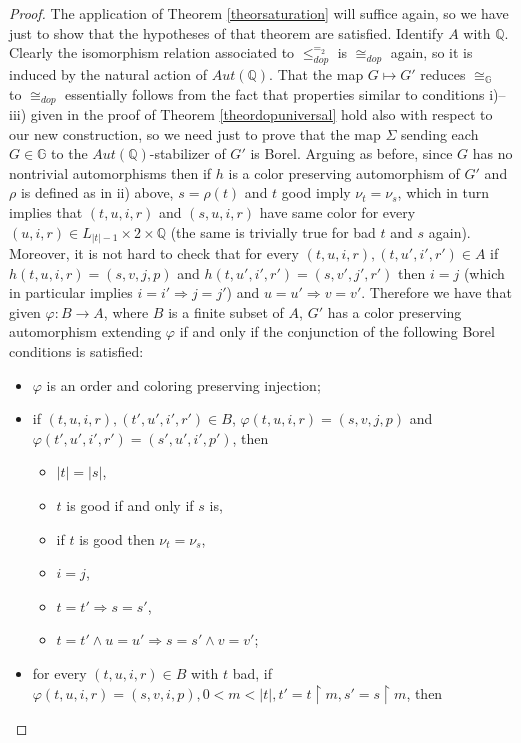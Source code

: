 \documentclass{amsart}
\theoremstyle{definition}
\theoremstyle{remark}
\begin{document}
\begin{proof}
 The application of Theorem \ref{theorsaturation} will suffice again,
 so we have just to show that the hypotheses of that
 theorem are satisfied. Identify $A$ with $ {\mathbb{Q}} $. Clearly the
 isomorphism relation associated to $\leq_{dop}^{=_2}$ is
  $\cong_{dop}$ again, so it is induced by the natural action of
  $Aut({\mathbb{Q}})$. That the map $G \mapsto G'$ reduces $\cong_{\mathbb{G}}$ to $\cong_{dop}$ essentially follows from
 the fact that properties similar to conditions
 i)--iii) given in the proof of Theorem \ref{theordopuniversal} hold
 also with respect to our new construction, so we
 need just to prove that the map $\Sigma$ sending each $G \in {\mathbb{G}}$ to the
 $Aut({\mathbb{Q}})$-stabilizer of $G'$ is Borel. Arguing as before,
 since $G$ has no nontrivial automorphisms then if $h$ is a color preserving
 automorphism of $G'$ and $\rho$ is defined as in ii)
 above, $s= \rho(t)$ and $t$ good imply $\nu_t = \nu_s$, which in
 turn implies that $(t,u,i,r)$ and $(s,u,i,r)$ have
 same color for every $(u,i,r) \in L_{|t|-1} \times 2 \times {\mathbb{Q}}$
 (the same is trivially true for bad $t$ and $s$
 again). Moreover, it is not hard to check that for every $(t,u,i,r),
 (t,u',i',r') \in A$ if $h(t,u,i,r) = (s,v,j,p)$ and
 $h(t,u',i',r') = (s,v',j',r')$ then $i=j$ (which in particular
 implies $i= i' {\Rightarrow} j = j'$) and $u = u' {\Rightarrow} v = v'$.
 Therefore we have that given ${\varphi} \colon B\to A$, where $B$ is a
 finite subset of $A$, $G'$ has a color preserving automorphism
 extending ${\varphi}$ if
 and only if the conjunction of the following Borel conditions is
 satisfied:
\begin{itemize}
 \item ${\varphi}$ is an order and coloring preserving injection;
 \item if $(t,u,i,r),(t',u',i',r') \in B$, ${\varphi}(t,u,i,r) = (s,v,j,p)$
   and ${\varphi}(t',u',i',r') = (s',u',i',p')$, then
\begin{itemize}
\item $|t|=|s|$,
\item $t$ is
good if and only if $s$ is,
\item if $t$ is good then $\nu_t = \nu_s$,
\item $i=j$,
\item $t = t' {\Rightarrow} s=s'$,
\item $t = t' \wedge u = u' {\Rightarrow} s=s'
\wedge v = v'$;
\end{itemize}
\item for every $(t,u,i,r)\in B$ with $t$ bad, if $ {\varphi} (t,u,i,r)=(s,v,i,p),0<m<|t|,t'=t\restriction m,s'=s\restriction m$, then

\end{itemize}
\end{proof}
\end{document}
